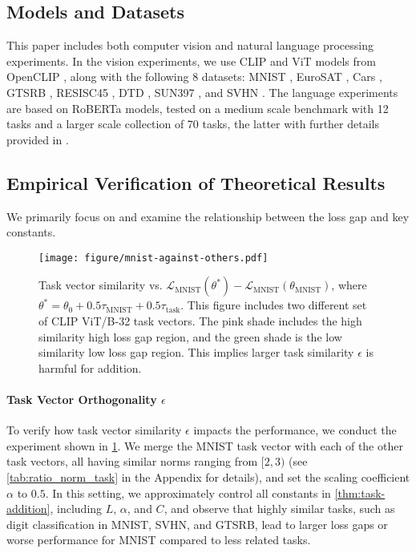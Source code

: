
\subsection{Models and Datasets}
This paper includes both computer vision and natural language processing experiments. In the vision experiments, we use CLIP \citep{radford2021learning} and ViT \citep{dosovitskiy2020image} models from OpenCLIP \citep{ilharco_gabriel_2021_5143773}, along with the following 8 datasets: MNIST \citep{lecun1998gradient}, EuroSAT \citep{helber2019eurosat}, Cars \citep{krause20133d}, GTSRB \citep{stallkamp2012man}, RESISC45 \citep{cheng2017remote}, DTD \citep{cimpoi2014describing}, SUN397 \citep{xiao2010sun}, and SVHN \citep{netzer2011reading}. The language experiments are based on RoBERTa \citep{liu2019roberta} models, tested on a medium scale benchmark with 12 tasks \citep{panigrahi2023task, he2024localize} and a larger scale collection of 70 tasks, the latter with further details provided in .

\subsection{Empirical Verification of Theoretical Results}
We primarily focus on  and examine the relationship between the loss gap and key constants.

\begin{figure}[tb]
    \centering
    \texttt{[image: figure/mnist-against-others.pdf]}
    \vspace{-2em}
    \caption{Task vector similarity vs. $\mathcal{L}_\text{MNIST}(\theta^*) - \mathcal{L}_\text{MNIST}(\theta_\text{MNIST})$, where $\theta^* = \theta_0 + 0.5\tau_\text{MNIST} + 0.5\tau_\text{task}$. This figure includes two different set of CLIP ViT/B-32 task vectors. The pink shade includes the high similarity high loss gap region, and the green shade is the low similarity low loss gap region. This implies larger task similarity $\epsilon$ is harmful for addition.}
    \label{fig:mnist-againt-others}
\end{figure}

\paragraph{Task Vector Orthogonality $\epsilon$}
To verify how task vector similarity $\epsilon$ impacts the performance, we conduct the experiment shown in \cref{fig:mnist-againt-others}. We merge the MNIST task vector with each of the other task vectors, all having similar norms ranging from $[2,3)$ (see \cref{tab:ratio_norm_task} in the Appendix for details), and set the scaling coefficient $\alpha$ to $0.5$. In this setting, we approximately control all constants in \cref{thm:task-addition}, including $L$, $\alpha$, and $C$, and observe that highly similar tasks, such as digit classification in MNIST, SVHN, and GTSRB, lead to larger loss gaps or worse performance for MNIST compared to less related tasks.

